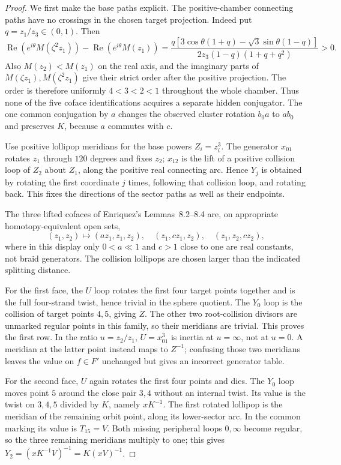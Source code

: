 \begin{proof}
We first make the base paths explicit. The positive-chamber
connecting paths have no crossings in the chosen target projection.
Indeed put $q=z_1/z_3\in(0,1)$. Then
\[
 \operatorname{Re}(e^{i\theta}M(\zeta^2z_1))
 -\operatorname{Re}(e^{i\theta}M(z_1))
 =\frac{q[3\cos\theta(1+q)-\sqrt3\sin\theta(1-q)]}
        {2z_3(1-q)(1+q+q^2)}>0.
\]
Also $M(z_2)<M(z_1)$ on the real axis, and the imaginary parts
of $M(\zeta z_1),M(\zeta^2z_1)$ give their strict order after the
positive projection. The order is therefore uniformly
$4<3<2<1$ throughout the whole chamber. Thus none of the five
coface identifications acquires a separate hidden conjugator.
The one common conjugation by $a$ changes the observed cluster
rotation $b_0a$ to $ab_0$ and preserves $K$, because $a$ commutes
with $c$.

Use positive lollipop meridians for the base powers
$Z_i=z_i^3$. The generator $x_{01}$ rotates $z_1$ through
$120$ degrees and fixes $z_2$; $x_{12}$ is the lift of a positive
collision loop of $Z_2$ about $Z_1$, along the positive real
connecting arc. Hence $Y_j$ is obtained by rotating the first
coordinate $j$ times, following that collision loop, and rotating
back. This fixes the directions of the sector paths as well as
their endpoints.

The three lifted cofaces of Enriquez's Lemmas~8.2--8.4 are, on
appropriate homotopy-equivalent open sets,
\[
 (z_1,z_2)\longmapsto
 (az_1,z_1,z_2),\quad(z_1,cz_1,z_2),\quad(z_1,z_2,cz_2),
\]
where in this display only $0<a\ll1$ and $c>1$ close to one are
real constants, not braid generators. The collision lollipops
are chosen larger than the indicated splitting distance.

For the first face, the $U$ loop rotates the first four target
points together and is the full four-strand twist, hence trivial
in the sphere quotient. The $Y_0$ loop is the collision of target
points $4,5$, giving $Z$. The other two root-collision divisors
are unmarked regular points in this family, so their meridians
are trivial. This proves the first row. In the ratio
$u=z_2/z_1$, $U=x_{01}^3$ is inertia at $u=\infty$, not at
$u=0$. A meridian at the latter point instead maps to $Z^{-1}$;
confusing those two meridians leaves the value on $f\in F'$
unchanged but gives an incorrect generator table.

For the second face, $U$ again rotates the first four points
and dies. The $Y_0$ loop moves point $5$ around the close pair
$3,4$ without an internal twist. Its value is the twist on
$3,4,5$ divided by $K$, namely $xK^{-1}$. The first rotated
lollipop is the meridian of the remaining orbit point, along
its lower-sector arc. In the common marking its value is
$T_{15}=V$. Both missing peripheral loops $0,\infty$ become
regular, so the three remaining meridians multiply to one;
this gives $Y_2=(xK^{-1}V)^{-1}=K(xV)^{-1}$.


\end{proof}

